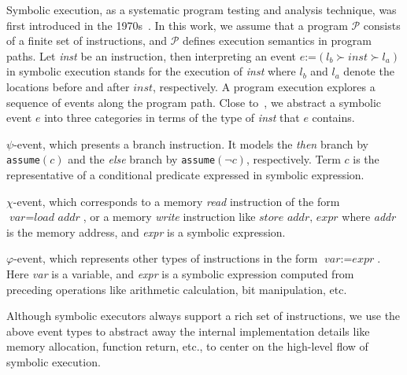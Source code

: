 \documentclass[sigconf]{acmart}
\newcommand{\textcode}[1]{\texttt{#1}}
\newcommand{\prog}{\mathcal{P}}
\begin{document}
Symbolic execution, as a systematic program testing and analysis technique, 
was first introduced in the 1970s~\cite{King76,Clarke76}. In this work, we 
assume that a program $\prog$ consists of a finite set of instructions, and 
$\prog$ defines execution semantics in program paths. Let \textit{inst} be 
an instruction, then interpreting an event $e$:=$(l_b\succ inst\succ l_a)$ 
in symbolic execution stands for the execution of \textit{inst} where $l_b$ 
and $l_a$ denote the locations before and after $inst$, respectively. A 
program execution explores a sequence of events along the program path. 
Close to~\cite{GuoKWYG15,GuoWW18}, we abstract a symbolic event $e$ into 
three categories in terms of the type of \textit{inst} that $e$ contains.


\begin{itemize*}
  \item $\psi$-event, which presents a branch instruction. It models the 
    \textit{then} branch by \textcode{assume$(c)$} and the \textit{else} 
    branch by \textcode{assume$(\neg c)$}, respectively. Term $\textit{c}$ 
    is the representative of a conditional predicate expressed in symbolic 
    expression. 

  \item $\chi$-event, which corresponds to a memory \textit{read} instruction 
    of the form $\textit{var}=\textit{load~addr}$, or a memory \textit{write} 
    instruction like $\textit{store~addr, expr}$ where \textit{addr} is the 
    memory address, and \textit{expr} is a symbolic expression.

  \item $\varphi$-event, which represents other types of instructions in the 
    form $\textit{var}:=\textit{expr}$. Here \textit{var} is a variable, and 
    \textit{expr} is a symbolic expression computed from preceding operations 
    like arithmetic calculation, bit manipulation, etc.
\end{itemize*}


Although symbolic executors always support a rich set of instructions, we use 
the above event types to abstract away the internal implementation details like 
memory allocation, function return, etc., to center on the high-level flow of 
symbolic execution.
\end{document}
